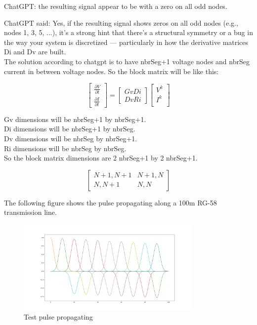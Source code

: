 \documentclass[12pt, letterpaper]{article}
\begin{document}
ChatGPT:
the resulting signal appear to be with a zero on all odd nodes.
	
	
	ChatGPT said:
	Yes, if the resulting signal shows zeros on all odd nodes (e.g., nodes 1, 3, 5, ...), it's a strong hint that there’s a structural symmetry or a bug in the way your system is discretized — particularly in how the derivative matrices Di and Dv are built.\\
	
The solution according to chatgpt is to have nbrSeg+1 voltage nodes and nbrSeg current in between voltage nodes. So the block matrix will be like this:

\begin{equation}
	\begin{bmatrix}
		\frac{\partial{V}}{\partial{t}} \\
		\frac{\partial{I}}{\partial{t}} 
	\end{bmatrix}	
	=
	\begin{bmatrix}
		Gv Di \\
		Dv Ri
	\end{bmatrix}
	\begin{bmatrix}
		V^k \\
		I^k \\
	\end{bmatrix}
\end{equation}

Gv dimensions will be nbrSeg+1 by nbrSeg+1.\\
Di dimensions will be nbrSeg+1 by nbrSeg.\\
Dv dimensions will be nbrSeg by nbrSeg+1.\\
Ri dimensions will be nbrSeg by nbrSeg.\\

So the block matrix dimensions are 2 nbrSeg+1 by 2 nbrSeg+1.

\begin{equation}
	\begin{bmatrix}
		N+1, N+1 &  N+1, N \\
		N, N+1 & N, N
	\end{bmatrix}
\end{equation}

The following figure shows the pulse propagating along a 100m RG-58 transmission line.

\begin{figure}[h]
	\centering
	\includegraphics[width=0.8\textwidth]{pulse-python.png} %
	\caption{Test pulse propagating}
	\label{fig:example}
\end{figure}
\end{document}
